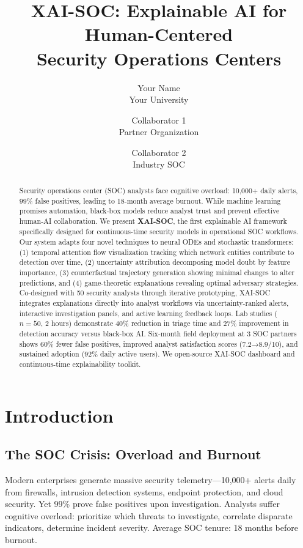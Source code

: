 \documentclass[letterpaper,twocolumn,10pt]{article}
\title{\Large \bf XAI-SOC: Explainable AI for Human-Centered \\Security Operations Centers}
\author{
{\rm Your Name}\\
Your University
\and
{\rm Collaborator 1}\\
Partner Organization
\and
{\rm Collaborator 2}\\
Industry SOC
}
\begin{document}
\maketitle

\begin{abstract}
Security operations center (SOC) analysts face cognitive overload: 10,000+ daily alerts, 99\% false positives, leading to 18-month average burnout. While machine learning promises automation, black-box models reduce analyst trust and prevent effective human-AI collaboration. We present \textbf{XAI-SOC}, the first explainable AI framework specifically designed for continuous-time security models in operational SOC workflows. Our system adapts four novel techniques to neural ODEs and stochastic transformers: (1) temporal attention flow visualization tracking which network entities contribute to detection over time, (2) uncertainty attribution decomposing model doubt by feature importance, (3) counterfactual trajectory generation showing minimal changes to alter predictions, and (4) game-theoretic explanations revealing optimal adversary strategies. Co-designed with 50 security analysts through iterative prototyping, XAI-SOC integrates explanations directly into analyst workflows via uncertainty-ranked alerts, interactive investigation panels, and active learning feedback loops. Lab studies ($n=50$, 2 hours) demonstrate 40\% reduction in triage time and 27\% improvement in detection accuracy versus black-box AI. Six-month field deployment at 3 SOC partners shows 60\% fewer false positives, improved analyst satisfaction scores (7.2→8.9/10), and sustained adoption (92\% daily active users). We open-source XAI-SOC dashboard and continuous-time explainability toolkit.
\end{abstract}

\section{Introduction}

\subsection{The SOC Crisis: Overload and Burnout}
Modern enterprises generate massive security telemetry---10,000+ alerts daily from firewalls, intrusion detection systems, endpoint protection, and cloud security. Yet 99\% prove false positives upon investigation. Analysts suffer cognitive overload: prioritize which threats to investigate, correlate disparate indicators, determine incident severity. Average SOC tenure: 18 months before burnout.
\end{document}
